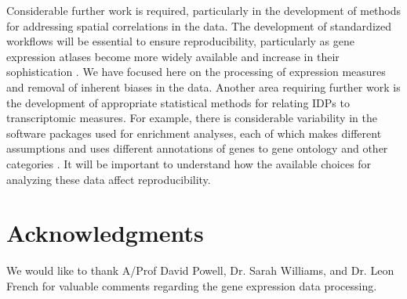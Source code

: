 Considerable further work is required, particularly in the development of methods for addressing spatial correlations in the data. The development of standardized workflows will be essential to ensure reproducibility, particularly as gene expression atlases become more widely available and increase in their sophistication \citep{Lein2007a,Harris2010,Miller2014}. We have focused here on the processing of expression measures and removal of inherent biases in the data. Another area requiring further work is the development of appropriate statistical methods for relating IDPs to transcriptomic measures. For example, there is considerable variability in the software packages used for enrichment analyses, each of which makes different assumptions and uses different annotations of genes to gene ontology and other categories \citep{Rhee2008}. It will be important to understand how the available choices for analyzing these data affect reproducibility.

\section*{Acknowledgments}

We would like to thank A/Prof David Powell, Dr. Sarah Williams, and Dr. Leon French for valuable comments regarding the gene expression data processing.
